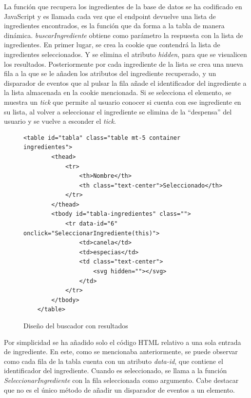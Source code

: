 La función que recupera los ingredientes de la base de datos se ha codificado en JavaScript y es llamada cada vez que el \gls{endpoint} devuelve una lista de ingredientes encontrados, es la función que da forma a la tabla de manera dinámica. \textit{buscarIngrediente} obtiene como parámetro la respuesta con la lista de ingredientes. En primer lugar, se crea la \gls{cookie} que contendrá la lista de ingredientes seleccionados. Y se elimina el atributo \textit{hidden}, para que se visualicen los resultados. Posteriormente por cada ingrediente de la lista se crea una nueva fila a la que se le añaden los atributos del ingrediente recuperado, y un disparador de eventos que al pulsar la fila añade el identificador del ingrediente a la lista almacenada en la \gls{cookie} mencionada. Si se selecciona el elemento, se muestra un \textit{tick} que permite al usuario conocer si cuenta con ese ingrediente en su lista, al volver a seleccionar el ingrediente se elimina de la ``despensa'' del usuario y se vuelve a esconder el \textit{tick}.
\begin{figure}[h!]
\centering
{}
\label{fig:buscador-tabla}
\begin{lstlisting}[style=consola]
    <table id="tabla" class="table mt-5 container ingredientes">
        <thead>
            <tr>
                <th>Nombre</th>
                <th class="text-center">Seleccionado</th>
            </tr>
        </thead>
        <tbody id="tabla-ingredientes" class="">
            <tr data-id="6" onclick="SeleccionarIngrediente(this)">
                <td>canela</td>
                <td>especias</td>
                <td class="text-center">
                    <svg hidden=""></svg>
                </td>
            </tr>
        </tbody>
    </table>
\end{lstlisting}
\caption{Diseño del buscador con resultados}
\end{figure}

Por simplicidad se ha añadido solo el código \gls{HTML} relativo a una sola entrada de ingrediente. En este, como se mencionaba anteriormente, se puede observar como cada fila de la tabla cuenta con un atributo \textit{data-id}, que contiene el identificador del ingrediente. Cuando es seleccionado, se llama a la función \textit{SeleccionarIngrediente} con la fila seleccionada como argumento. Cabe destacar que no es el único método de añadir un disparador de eventos a un elemento. 

